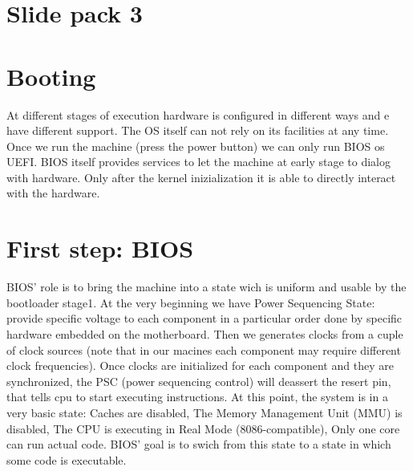 \documentclass[a4paper,12pt]{article}
\begin{document}
\section{Slide pack 3}

\section{Booting}
At different stages of execution hardware is configured in different ways and e have different support. The OS itself can not rely on its facilities at any time. Once we run the machine (press the power button) we can only run BIOS os UEFI. BIOS itself provides services to let the machine at early stage to dialog with hardware. Only after the kernel inizialization it is able to directly interact with the hardware.

\section{First step: BIOS}
BIOS' role is to bring the machine into a state wich is uniform and usable by the bootloader stage1. At the very beginning we have Power Sequencing State: provide specific voltage to each component in a particular order done by specific hardware embedded on the motherboard. Then we generates clocks from a cuple of clock sources (note that in our macines each component may require different clock frequencies). Once clocks are initialized for each component and they are synchronized, the PSC (power sequencing control) will deassert the resert pin, that tells cpu to start executing instructions. At this point, the system is in a very basic state: Caches are disabled, The Memory Management Unit (MMU) is disabled, The CPU is executing in Real Mode (8086-compatible), Only one core can run actual code. BIOS' goal is to swich from this state to a state in which some code is executable.
\end{document}
